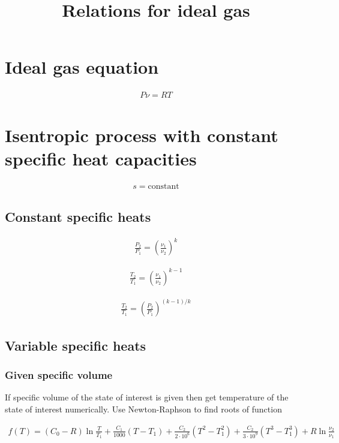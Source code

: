 \documentclass{article}
\title{Relations for ideal gas}
\begin{document}
	\maketitle

	\section{Ideal gas equation}

	\begin{align*}
		P\nu = RT
	\end{align*}

	\section{Isentropic process with constant specific heat capacities}

	\begin{align*}
		s = \text{constant}
	\end{align*}

	\subsection{Constant specific heats}

	\begin{align*}
		\frac{P_2}{P_1} = \left(\frac{\nu_1}{\nu_2}\right)^k
	\end{align*}

	\begin{align*}
		\frac{T_2}{T_1} = \left(\frac{\nu_1}{\nu_2}\right)^{k-1}
	\end{align*}

	\begin{align*}
		\frac{T_2}{T_1} = \left(\frac{P_2}{P_1}\right)^{(k-1)/k}
	\end{align*}

	\subsection{Variable specific heats}

	\subsubsection{Given specific volume}

	If specific volume of the state of interest is given then get temperature of the state of interest numerically. Use Newton-Raphson to find roots of function

	\begin{align*}
		f(T) = (C_0 - R)\ln\frac{T}{T_1} + \frac{C_1}{1000}(T - T_1) + \frac{C_2}{2\cdot10^6}(T^2 - T_1^2) + \frac{C_2}{3\cdot10^9}(T^3 - T_1^3) + R\ln\frac{\nu_2}{\nu_1}
	\end{align*}
\end{document}
